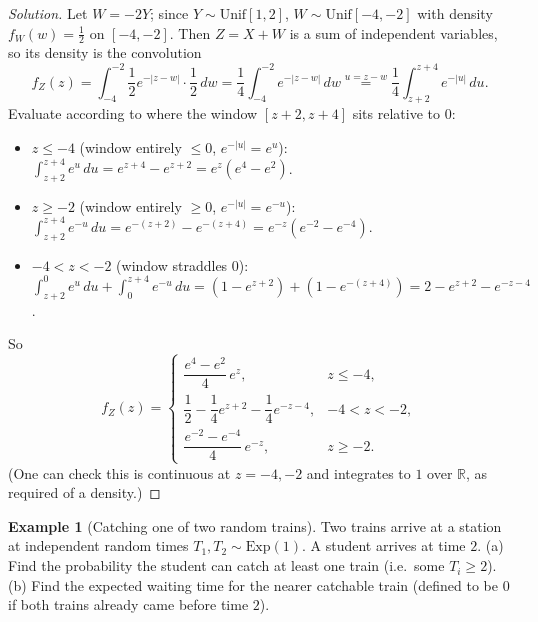 \documentclass[11pt]{article}
\theoremstyle{definition}
\newtheorem{example}{Example}[section]
\newcommand{\R}{\mathbb{R}}
\begin{document}
\begin{proof}[Solution]
Let $W=-2Y$; since $Y\sim\mathrm{Unif}[1,2]$, $W\sim\mathrm{Unif}[-4,-2]$ with density $f_W(w)=\tfrac12$ on $[-4,-2]$. Then $Z=X+W$ is a sum of independent variables, so its density is the convolution
\[
f_Z(z)=\int_{-4}^{-2} \frac12 e^{-|z-w|}\cdot\frac12\,dw = \frac14\int_{-4}^{-2}e^{-|z-w|}\,dw \overset{u=z-w}{=} \frac14\int_{z+2}^{z+4} e^{-|u|}\,du.
\]
Evaluate according to where the window $[z+2,z+4]$ sits relative to $0$:
\begin{itemize}
\item $z\le-4$ (window entirely $\le0$, $e^{-|u|}=e^u$): $\displaystyle\int_{z+2}^{z+4}e^u\,du=e^{z+4}-e^{z+2}=e^z(e^4-e^2)$.
\item $z\ge-2$ (window entirely $\ge0$, $e^{-|u|}=e^{-u}$): $\displaystyle\int_{z+2}^{z+4}e^{-u}\,du=e^{-(z+2)}-e^{-(z+4)}=e^{-z}(e^{-2}-e^{-4})$.
\item $-4<z<-2$ (window straddles $0$): $\displaystyle\int_{z+2}^0e^u\,du+\int_0^{z+4}e^{-u}\,du = (1-e^{z+2})+(1-e^{-(z+4)}) = 2-e^{z+2}-e^{-z-4}$.
\end{itemize}
So
\[
\boxed{f_Z(z)=\begin{cases}
\dfrac{e^4-e^2}{4}\,e^{z}, & z\le-4,\\[2mm]
\dfrac12-\dfrac14e^{z+2}-\dfrac14e^{-z-4}, & -4<z<-2,\\[2mm]
\dfrac{e^{-2}-e^{-4}}{4}\,e^{-z}, & z\ge-2.
\end{cases}}
\]
(One can check this is continuous at $z=-4,-2$ and integrates to $1$ over $\R$, as required of a density.)
\end{proof}

\begin{example}[Catching one of two random trains]
Two trains arrive at a station at independent random times $T_1,T_2\sim\mathrm{Exp}(1)$. A student arrives at time $2$. (a) Find the probability the student can catch at least one train (i.e.\ some $T_i\ge2$). (b) Find the expected waiting time for the nearer catchable train (defined to be $0$ if both trains already came before time $2$).
\end{example}
\end{document}
